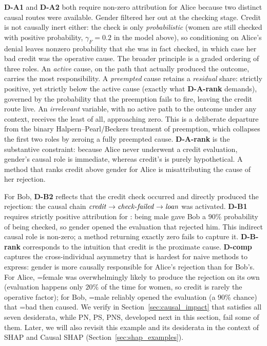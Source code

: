 \noindent \textbf{D-A1} and \textbf{D-A2} both require non-zero attribution for Alice because two
distinct causal routes were available. Gender filtered her out at the checking stage. Credit is not
causally inert either: the check is only \emph{probabilistic} (women are still checked with positive
probability, $\gamma_F=0.2$ in the model above), so conditioning on Alice's denial leaves nonzero
probability that she was in fact checked, in which case her bad credit was the operative cause. The
broader principle is a graded ordering of three roles. An \emph{active} cause, on the path that actually
produced the outcome, carries the most responsibility. A \emph{preempted} cause retains a
\emph{residual} share: strictly positive, yet strictly below the active cause (exactly what
\textbf{D-A-rank} demands), governed by the probability that the preemption fails to fire,
leaving the credit route live. An \emph{irrelevant} variable, with no active path to the outcome under
any context, receives the least of all, approaching zero. This is a deliberate departure from the binary
Halpern--Pearl/Beckers treatment of preemption, which collapses the first two roles by zeroing a fully
preempted cause. \textbf{D-A-rank} is the substantive constraint: because Alice never underwent a
credit evaluation, gender's causal role is immediate, whereas credit's is purely
hypothetical. A method that ranks credit above gender for Alice is misattributing the cause of her
rejection.

For Bob, \textbf{D-B2} reflects that the credit check occurred and directly produced the rejection:
the causal chain $\varname{credit} \to \varname{check\text{-}failed} \to \varname{loan}$ was
activated. \textbf{D-B1} requires strictly positive attribution for : being male
gave Bob a $90\%$ probability of being checked, so gender opened the evaluation that rejected him.
This indirect causal role is non-zero; a method returning exactly zero fails to capture it.
\textbf{D-B-rank} corresponds to the intuition that credit is the proximate cause.
\textbf{D-comp} captures the cross-individual asymmetry that is hardest for naive methods to
express: gender is more causally responsible for Alice's rejection than for Bob's. For
Alice, =female was overwhelmingly likely to produce the rejection on
its own (evaluation happens only $20\%$ of the time for women, so credit is rarely the
operative factor); for Bob, =male reliably opened the evaluation (a
$90\%$ chance) that =bad then caused.
We verify in Section~\ref{sec:causal_impact} that \ourapproach satisfies all seven
desiderata, while PN, PS, PNS, developed next in this section, fail some of them. Later,
we will also revisit this example and its desiderata in the context of SHAP and Causal
SHAP (Section~\ref{sec:shap_examples}).

